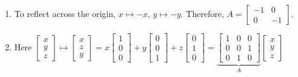 \documentclass[11pt]{article}
\begin{document}
\begin{itemize}
\begin{examplebox}[1.1]
\begin{enumerate}
		\end{enumerate}
		\begin{solution}[1.1] \quad\vspace{-0.2cm}
		\begin{enumerate}
		    \item To reflect across the origin, $x \mapsto -x$, $y \mapsto -y$. Therefore, $A = \begin{bmatrix}
	  -1 & 0\\
	0 & -1
	\end{bmatrix}$.

\item Here $\begin{bmatrix}
  x\\
y\\
z
\end{bmatrix} \mapsto \begin{bmatrix}
  x\\
z\\
y
\end{bmatrix} = x \begin{bmatrix}
  1\\
0\\
0
\end{bmatrix} + y\begin{bmatrix}
  0\\
0\\
1
\end{bmatrix} + z \begin{bmatrix}
  0\\
1\\
0
\end{bmatrix} = \underbrace{\begin{bmatrix}
  1 & 0 & 0\\
0 & 0 & 1\\
0 & 1 & 0
\end{bmatrix}}_A \begin{bmatrix}
  x\\
y\\
z
\end{bmatrix}$


\end{enumerate}
\end{solution}
\end{examplebox}
\end{itemize}
\end{document}
